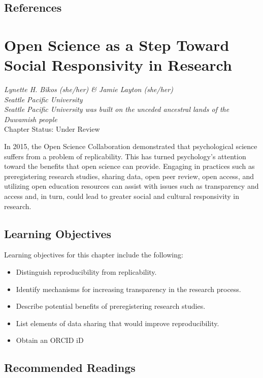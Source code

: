 \documentclass[
  11pt,
]{book}
\providecommand{\tightlist}{%
  \setlength{\itemsep}{0pt}\setlength{\parskip}{0pt}}
\begin{document}
\hypertarget{references}{%
\section{References}\label{references}}

\hypertarget{OpSci}{%
\chapter{Open Science as a Step Toward Social Responsivity in Research}\label{OpSci}}

\emph{Lynette H. Bikos (she/her) \& Jamie Layton (she/her)}\\
\emph{Seattle Pacific University}\\
\emph{Seattle Pacific University was built on the unceded ancestral lands of the Duwamish people}\\
Chapter Status: Under Review

In 2015, the Open Science Collaboration demonstrated that psychological science suffers from a problem of replicability. This has turned psychology's attention toward the benefits that open science can provide. Engaging in practices such as preregistering research studies, sharing data, open peer review, open access, and utilizing open education resources can assist with issues such as transparency and access and, in turn, could lead to greater social and cultural responsivity in research.

\hypertarget{learning-objectives-1}{%
\section{Learning Objectives}\label{learning-objectives-1}}

Learning objectives for this chapter include the following:

\begin{itemize}
\tightlist
\item
  Distinguish reproducibility from replicability.
\item
  Identify mechanisms for increasing transparency in the research process.
\item
  Describe potential benefits of preregistering research studies.
\item
  List elements of data sharing that would improve reproducibility.
\item
  Obtain an ORCID iD
\end{itemize}

\hypertarget{recommended-readings-1}{%
\section{Recommended Readings}\label{recommended-readings-1}}
\end{document}
